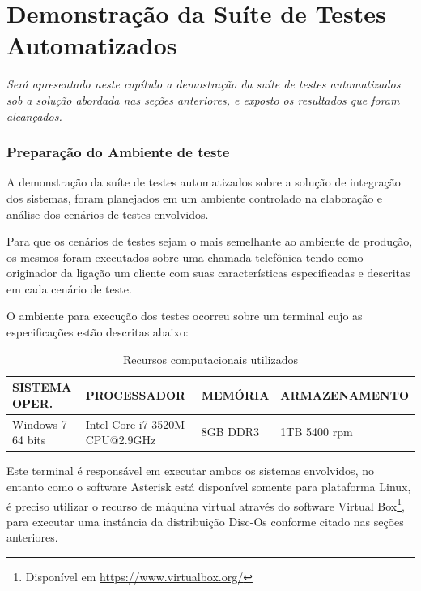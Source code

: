 \chapter[Demonstração da Suíte de Testes Automatizados]{\textbf{D}emonstração da \textbf{S}uíte de \textbf{T}estes \textbf{A}utomatizados}

\textit{Será apresentado neste capítulo a demostração da suíte de testes automatizados sob a solução abordada nas seções anteriores, e exposto os resultados que foram alcançados.}


\subsection{Preparação do Ambiente de teste}

A demonstração da suíte de testes automatizados sobre a solução de integração dos sistemas, foram planejados em um ambiente controlado na elaboração e análise dos cenários de testes envolvidos. 

Para que os cenários de testes sejam o mais semelhante ao ambiente de produção, os mesmos foram executados sobre uma chamada telefônica tendo como originador da ligação um cliente com suas características especificadas e descritas em cada cenário de teste. 

O ambiente para execução dos testes ocorreu sobre um terminal cujo as especificações estão descritas abaixo:

\begin{table}[htb]
	\footnotesize
	\caption{Recursos computacionais utilizados}
	\label{tabela:recursosUtilizados}
	\begin{tabular}{|p{3.5cm}|p{3cm}|p{2cm}|p{4cm}|} \hline
		\textbf{SISTEMA OPER.} 	& \textbf{PROCESSADOR} 				& \textbf{MEMÓRIA} 	& \textbf{ARMAZENAMENTO}  \\ \hline
		Windows 7 64 bits 		& Intel Core i7-3520M CPU@2.9GHz 	& 8GB DDR3			& 1TB 5400 rpm \\ \hline
	\end{tabular}
\end{table}

Este terminal é responsável em executar ambos os sistemas envolvidos, no entanto como o software Asterisk está disponível somente para plataforma Linux, é preciso utilizar o recurso de máquina virtual através do software Virtual Box\footnote{Disponível em \url{https://www.virtualbox.org/}}, para executar uma instância da distribuição Disc-Os conforme citado nas seções anteriores.
 
